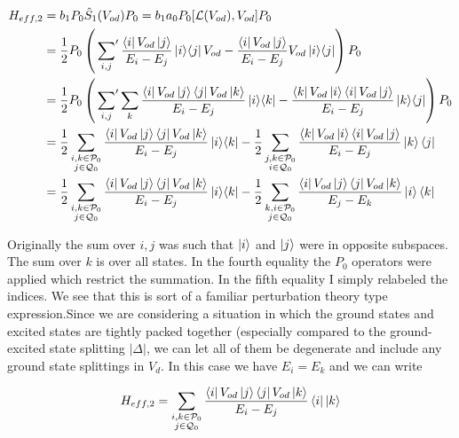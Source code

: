\documentclass[12pt]{article}
\newcommand{\ketbra}[2]{\Ket{#1}\!\Bra{#2}}
\begin{document}
\begin{equation}
\begin{split}
H_{eff,2} &= b_1 P_0\hat{S}_1(V_{od})P_0 = b_1a_0P_0 [\mathcal{L}(V_{od}),V_{od}]P_0\\
&=  \frac{1}{2} P_0\left( \sideset{}{'}\sum_{i,j}\frac{\bra{i}V_{od}\ket{j}}{E_i-E_j}\ketbra{i}{j}V_{od} - \frac{\bra{i}V_{od}\ket{j}}{E_i-E_j}V_{od}\ketbra{i}{j}\right)P_0\\
&= \frac{1}{2} P_0\left( \sideset{}{'}\sum_{i,j}\sum_k\frac{\bra{i}V_{od}\ket{j}\bra{j}V_{od}\ket{k}}{E_i-E_j}\ketbra{i}{k} - \frac{\bra{k}V_{od}\ket{i}\bra{i}V_{od}\ket{j}}{E_i-E_j}\ketbra{k}{j}\right)P_0\\
&= \frac{1}{2} \sum_{\substack{i,k \in \mathcal{P}_0\\j  \in \mathcal{Q}_0}} \frac{\bra{i}V_{od}\ket{j}\bra{j}V_{od}\ket{k}}{E_i-E_j} \ketbra{i}{k} - \frac{1}{2}\sum_{\substack{j,k \in \mathcal{P}_0\\i\in\mathcal{Q}_0}} \frac{\bra{k}V_{od}\ket{i}\bra{i}V_{od}\ket{j}}{E_i-E_j}\ket{k}\bra{j}\\
&=\frac{1}{2} \sum_{\substack{i,k \in \mathcal{P}_0\\j  \in \mathcal{Q}_0}} \frac{\bra{i}V_{od}\ket{j}\bra{j}V_{od}\ket{k}}{E_i-E_j} \ketbra{i}{k} - \frac{1}{2}\sum_{\substack{k,i \in \mathcal{P}_0\\j\in\mathcal{Q}_0}} \frac{\bra{i}V_{od}\ket{j}\bra{j}V_{od}\ket{k}}{E_j-E_k}\ket{i}\bra{k}\\
\end{split}
\end{equation}

Originally the sum over $i,j$ was such that $\ket{i}$ and $\ket{j}$ were in opposite subspaces. The sum over $k$ is over all states. In the fourth equality the $P_0$ operators were applied which restrict the summation. In the fifth equality I simply relabeled the indices. We see that this is sort of a familiar perturbation theory type expression.Since we are considering a situation in which the ground states and excited states are tightly packed together (especially compared to the ground-excited state splitting $|\Delta|$, we can let all of them be degenerate and include any ground state splittings in $V_d$. In this case we have $E_i = E_k$ and we can write

\begin{equation}
H_{eff,2} = \sum_{\substack{i,k \in \mathcal{P}_0\\j \in \mathcal{Q}_0}} \frac{\bra{i}V_{od}\ket{j}\bra{j}V_{od}\ket{k}}{E_i-E_j} \bra{i}\ket{k}
\end{equation}
\end{document}
